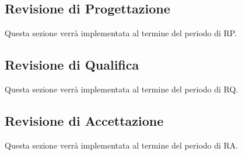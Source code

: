 \newpage

\subsection{Revisione di Progettazione}

Questa sezione verrà implementata al termine del periodo di RP.

\subsection{Revisione di Qualifica}

Questa sezione verrà implementata al termine del periodo di RQ.

\subsection{Revisione di Accettazione}

Questa sezione verrà implementata al termine del periodo di RA.

